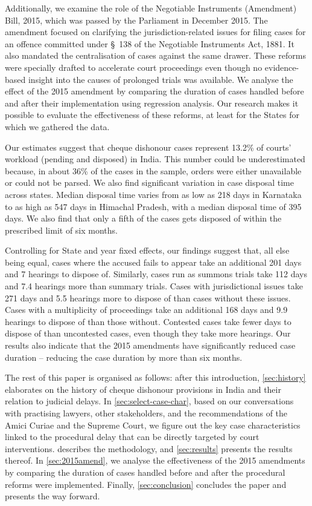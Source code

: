 \documentclass[12pt,a4paper]{article}
\begin{document}
Additionally, we examine the role of the Negotiable Instruments (Amendment) Bill, 2015, which was passed by the Parliament in December 2015. The amendment focused on clarifying the jurisdiction-related issues for filing cases for an offence committed under \S~138 of the Negotiable Instruments Act, 1881. It also mandated the centralisation of cases against the same drawer. These reforms were specially drafted to accelerate court proceedings even though no evidence-based insight into the causes of prolonged trials was available. We analyse the effect of the 2015 amendment by comparing the duration of cases handled before and after their implementation using regression analysis. Our research makes it possible to evaluate the effectiveness of these reforms, at least for the States for which we gathered the data.

Our estimates suggest that cheque dishonour cases represent 13.2\% of courts' workload (pending and disposed) in India. This number could be underestimated because, in about 36\% of the cases in the sample, orders were either unavailable or could not be parsed. We also find significant variation in case disposal time across states. Median disposal time varies from as low as 218 days in Karnataka to as high as 547 days in Himachal Pradesh, with a median disposal time of 395 days. We also find that only a fifth of the cases gets disposed of within the prescribed limit of six months.

Controlling for State and year fixed effects, our findings suggest that, all else being equal, cases where the accused fails to appear take an additional 201 days and 7 hearings to dispose of. Similarly, cases run as summons trials take 112 days and 7.4 hearings more than summary trials. Cases with jurisdictional issues take 271 days and 5.5 hearings more to dispose of than cases without these issues. Cases with a multiplicity of proceedings take an additional 168 days and 9.9 hearings to dispose of than those without. Contested cases take fewer days to dispose of than uncontested cases, even though they take more hearings. Our results also indicate that the 2015 amendments have significantly reduced case duration -- reducing the case duration by more than six months.

The rest of this paper is organised as follows: after this introduction, \cref{sec:history} elaborates on the history of cheque dishonour provisions in India and their relation to judicial delays. In \cref{sec:select-case-char}, based on our conversations with practising lawyers, other stakeholders, and the recommendations of the Amici Curiae and the Supreme Court, we figure out the key case characteristics linked to the procedural delay that can be directly targeted by court interventions.  describes the methodology, and \cref{sec:results} presents the results thereof. In \cref{sec:2015amend}, we analyse the effectiveness of the 2015 amendments by comparing the duration of cases handled before and after the procedural reforms were implemented. Finally, \cref{sec:conclusion} concludes the paper and presents the way forward.
\end{document}
